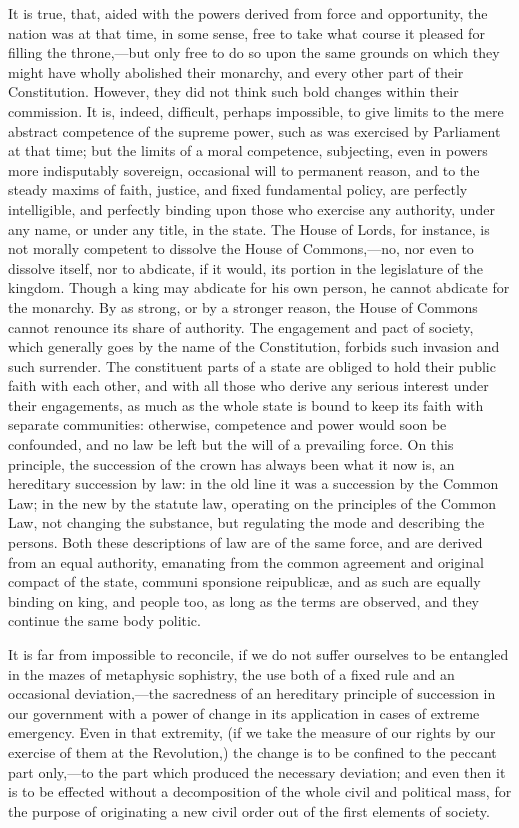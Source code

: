 It is true, that, aided with the powers derived from force and opportunity, the nation was at that time, in some sense, free to take what course it pleased for filling the throne,—but only free to do so upon the same grounds on which they might have wholly abolished their monarchy, and every other part of their Constitution. However, they did not think such bold changes within their commission. It is, indeed, difficult, perhaps impossible, to give limits to the mere abstract competence of the supreme power, such as was exercised by Parliament at that time; but the limits of a moral competence, subjecting, even in powers more indisputably sovereign, occasional will to permanent reason, and to the steady maxims of faith, justice, and fixed fundamental policy, are perfectly intelligible, and perfectly binding upon those who exercise any authority, under any name, or under any title, in the state. The House of Lords, for instance, is not morally competent to dissolve the House of Commons,—no, nor even to dissolve itself, nor to abdicate, if it would, its portion in the legislature of the kingdom. Though a king may abdicate for his own person, he cannot abdicate for the monarchy. By as strong, or by a stronger reason, the House of Commons cannot renounce its share of authority. The engagement and pact of society, which generally goes by the name of the Constitution, forbids such invasion and such surrender. The constituent parts of a state are obliged to hold their public faith with each other, and with all those who derive any serious interest under their engagements, as much as the whole state is bound to keep its faith with separate communities: otherwise, competence and power would soon be confounded, and no law be left but the will of a prevailing force. On this principle, the succession of the crown has always been what it now is, an hereditary succession by law: in the old line it was a succession by the Common Law; in the new by the statute law, operating on the principles of the Common Law, not changing the substance, but regulating the mode and describing the persons. Both these descriptions of law are of the same force, and are derived from an equal authority, emanating from the common agreement and original compact of the state, communi sponsione reipublicæ, and as such are equally binding on king, and people too, as long as the terms are observed, and they continue the same body politic.

It is far from impossible to reconcile, if we do not suffer ourselves to be entangled in the mazes of metaphysic sophistry, the use both of a fixed rule and an occasional deviation,—the sacredness of an hereditary principle of succession in our government with a power of change in its application in cases of extreme emergency. Even in that extremity, (if we take the measure of our rights by our exercise of them at the Revolution,) the change is to be confined to the peccant part only,—to the part which produced the necessary deviation; and even then it is to be effected without a decomposition of the whole civil and political mass, for the purpose of originating a new civil order out of the first elements of society.

